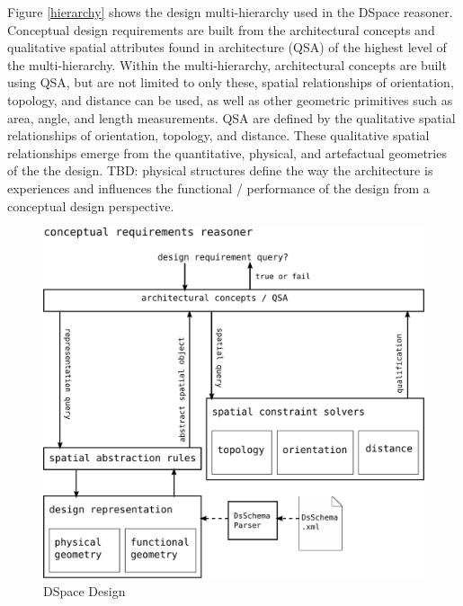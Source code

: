 \documentclass[12pt]{ucthesis}
\begin{document}
Figure \ref{hierarchy} shows the design multi-hierarchy used in the DSpace reasoner. Conceptual design requirements are built from the architectural concepts and qualitative spatial attributes found in architecture (QSA) of the highest level of the multi-hierarchy. Within the multi-hierarchy, architectural concepts are built using QSA, but are not limited to only these, spatial relationships of orientation, topology, and distance can be used, as well as other geometric primitives such as area, angle, and length measurements. QSA are defined by the qualitative spatial relationships of orientation, topology, and distance. These qualitative spatial relationships emerge from the quantitative, physical, and artefactual geometries of the the design. TBD: physical structures define the way the architecture is experiences and influences the functional / performance of the design from a conceptual design perspective. 


\begin{figure}[H]
\centering
\includegraphics[width=130mm]{design}
\caption{DSpace Design}
\label{dspace design}
\end{figure}


\end{document}
